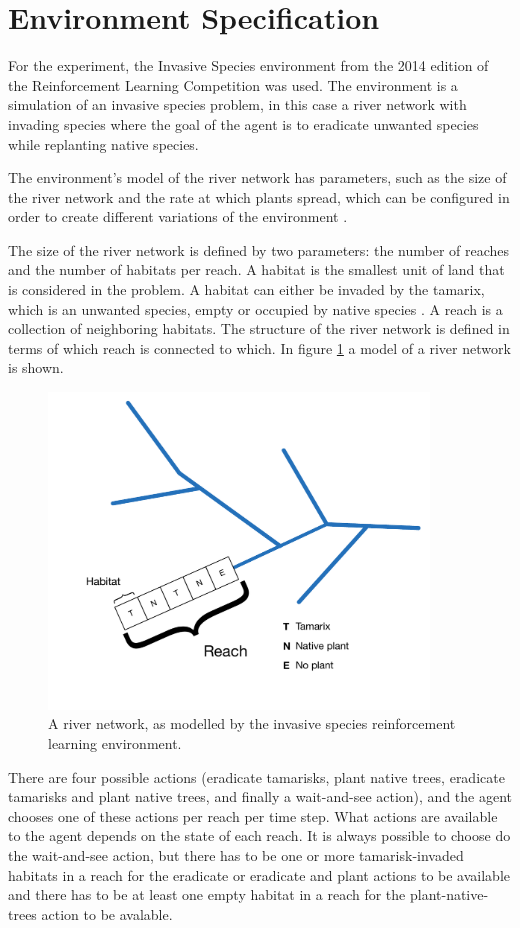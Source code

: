 \section{Environment Specification }
\label{sec:experiment_env}
For the experiment, the Invasive Species environment from the 2014 edition of the Reinforcement Learning Competition was used. The environment is a simulation of an invasive species problem, in this case a river network with invading species where the goal of the agent is to eradicate unwanted species while replanting native species. 

The environment's model of the river network has parameters, such as the size of the river network and the rate at which plants spread, which can be configured in order to create different variations of the environment \parencite{invasiveSpecis2014:Online}.

The size of the river network is defined by two parameters: the number of reaches and the number of habitats per reach. A habitat is the smallest unit of land that is considered in the problem. A habitat can either be invaded by the tamarix, which is an unwanted species, empty or occupied by native species \parencite{invasiveSpecis2014:Online}. A reach is a collection of neighboring habitats. The structure of the river network is defined in terms of which reach is connected to which. In figure \ref{fig:river} a model of a river network is shown.

\begin{figure}[ht]
\centering
\includegraphics[width=0.9\textwidth]{images/river_network.pdf}
\caption{A river network, as modelled by the invasive species reinforcement learning environment.}
\label{fig:river}
\end{figure}

There are four possible actions (eradicate tamarisks, plant native trees, eradicate tamarisks and plant native trees, and finally a wait-and-see action), and the agent chooses one of these actions per reach per time step. What actions are available to the agent depends on the state of each reach. It is always possible to choose do the wait-and-see action, but there has to be one or more tamarisk-invaded habitats in a reach for the eradicate or eradicate and plant actions to be available and there has to be at least one empty habitat in a reach for the plant-native-trees action to be avalable. 